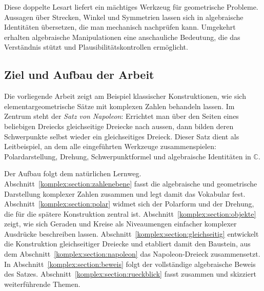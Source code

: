 Diese doppelte Lesart liefert ein mächtiges Werkzeug für geometrische
Probleme.
Aussagen über Strecken, Winkel und Symmetrien lassen sich in algebraische
Identitäten übersetzen, die man mechanisch nachprüfen kann.
Umgekehrt erhalten algebraische Manipulationen eine anschauliche
Bedeutung, die das Verständnis stützt und Plausibilitätskontrollen
ermöglicht.

%
%
\subsection{Ziel und Aufbau der Arbeit
\label{komplex:subsection:ziel-aufbau}}
Die vorliegende Arbeit zeigt am Beispiel klassischer Konstruktionen,
wie sich elementargeometrische Sätze mit komplexen Zahlen behandeln lassen.
Im Zentrum steht der \emph{Satz von Napoleon}:
Errichtet man über den Seiten eines beliebigen Dreiecks gleichseitige
Dreiecke nach aussen,
dann bilden deren Schwerpunkte selbst wieder ein gleichseitiges Dreieck.
Dieser Satz dient als Leitbeispiel,
an dem alle eingeführten Werkzeuge zusammenspielen:
Polardarstellung, Drehung, Schwerpunktformel und algebraische Identitäten
in $\mathbb{C}$.

Der Aufbau folgt dem natürlichen Lernweg.
Abschnitt~\ref{komplex:section:zahlenebene} fasst die algebraische und
geometrische Darstellung komplexer Zahlen zusammen
und legt damit das Vokabular fest.
Abschnitt~\ref{komplex:section:polar} widmet sich der Polarform und der
Drehung, die für die spätere Konstruktion zentral ist.
Abschnitt~\ref{komplex:section:objekte} zeigt,
wie sich Geraden und Kreise als Niveaumengen einfacher komplexer Ausdrücke
beschreiben lassen.
Abschnitt~\ref{komplex:section:gleichseitig} entwickelt die Konstruktion
gleichseitiger Dreiecke und etabliert damit den Baustein,
aus dem Abschnitt~\ref{komplex:section:napoleon} das Napoleon-Dreieck
zusammensetzt.
In Abschnitt~\ref{komplex:section:beweis} folgt der vollständige
algebraische Beweis des Satzes.
Abschnitt~\ref{komplex:section:rueckblick} fasst zusammen und skizziert
weiterführende Themen.
